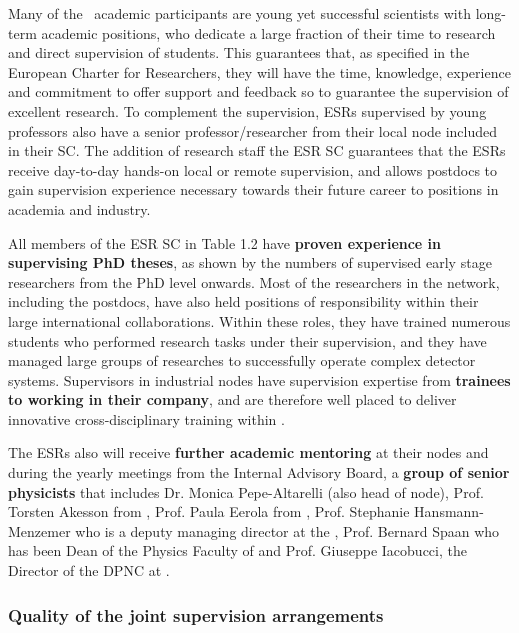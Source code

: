 Many of the \acronym\ academic participants are young yet successful scientists with long-term academic positions, who dedicate a large fraction of their time to research and direct supervision of students. 
This guarantees that, as specified in the European Charter for Researchers, they will have the time, knowledge, experience and commitment to offer support and feedback so to guarantee the supervision of excellent research. 
To complement the supervision, ESRs supervised by young professors also have a senior professor/researcher from their local node included in their SC.
The addition of research staff the ESR SC guarantees that the ESRs receive day-to-day hands-on local or remote supervision, and allows \acronym postdocs to gain supervision experience necessary towards their future career to positions in academia and industry. 

All members of the ESR SC in Table 1.2 have \textbf{proven experience in supervising PhD theses}, as shown by the numbers of supervised early stage researchers from the PhD level onwards. 
Most of the researchers in the network, including the postdocs, have also held positions of responsibility within their large international collaborations. 
Within these roles, they have trained numerous students who performed research tasks under their supervision, and they have managed large groups of researches to successfully operate complex detector systems. 
Supervisors in industrial nodes have supervision expertise from \textbf{trainees to working in their company}, and are therefore well placed to deliver innovative cross-disciplinary training within \acronym. 

The ESRs also will receive \textbf{further academic mentoring} at their nodes and during the yearly meetings from the Internal Advisory Board, a \textbf{group of senior physicists} that includes Dr. Monica Pepe-Altarelli (also head of \cern node), Prof. Torsten Akesson from \lundentity, Prof. Paula Eerola from \helsinkientity, Prof. Stephanie Hansmann- Menzemer who is a deputy managing director at the \heidelbergentity, Prof. Bernard Spaan who has been Dean of the Physics Faculty of \dortmund and Prof. Giuseppe Iacobucci, the Director of the DPNC at \unigeentity. 


\vskip-10pt

\subsubsection{Quality of the joint supervision arrangements}
\label{sec:jointsuperqual}

